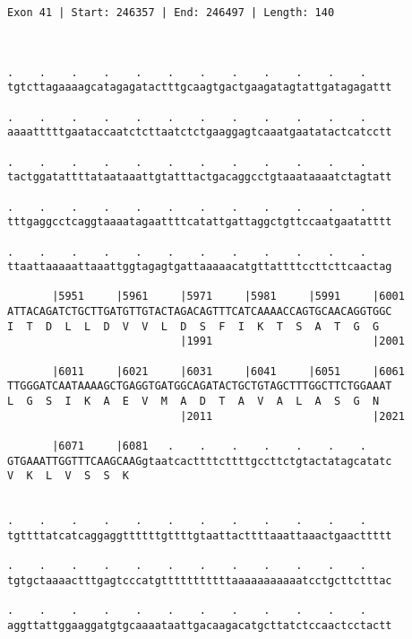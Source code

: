\documentclass{article}
\begin{document}
\begin{Verbatim}
Exon 41 | Start: 246357 | End: 246497 | Length: 140



.    .    .    .    .    .    .    .    .    .    .    .    
tgtcttagaaaagcatagagatactttgcaagtgactgaagatagtattgatagagattt
                                                            
.    .    .    .    .    .    .    .    .    .    .    .    
aaaatttttgaataccaatctcttaatctctgaaggagtcaaatgaatatactcatcctt
                                                            
.    .    .    .    .    .    .    .    .    .    .    .    
tactggatattttataataaattgtatttactgacaggcctgtaaataaaatctagtatt
                                                            
.    .    .    .    .    .    .    .    .    .    .    .    
tttgaggcctcaggtaaaatagaattttcatattgattaggctgttccaatgaatatttt
                                                            
.    .    .    .    .    .    .    .    .    .    .    .    
ttaattaaaaattaaattggtagagtgattaaaaacatgttattttccttcttcaactag
                                                            
       |5951     |5961     |5971     |5981     |5991     |6001
ATTACAGATCTGCTTGATGTTGTACTAGACAGTTTCATCAAAACCAGTGCAACAGGTGGC
I  T  D  L  L  D  V  V  L  D  S  F  I  K  T  S  A  T  G  G  
                           |1991                         |2001
  
       |6011     |6021     |6031     |6041     |6051     |6061
TTGGGATCAATAAAAGCTGAGGTGATGGCAGATACTGCTGTAGCTTTGGCTTCTGGAAAT
L  G  S  I  K  A  E  V  M  A  D  T  A  V  A  L  A  S  G  N  
                           |2011                         |2021
  
       |6071     |6081   .    .    .    .    .    .    .    
GTGAAATTGGTTTCAAGCAAGgtaatcacttttcttttgccttctgtactatagcatatc
V  K  L  V  S  S  K                                         
                                                            
  
.    .    .    .    .    .    .    .    .    .    .    .    
tgttttatcatcaggaggttttttgttttgtaattacttttaaattaaactgaacttttt
                                                            
.    .    .    .    .    .    .    .    .    .    .    .    
tgtgctaaaactttgagtcccatgtttttttttttaaaaaaaaaaatcctgcttctttac
                                                            
.    .    .    .    .    .    .    .    .    .    .    .    
aggttattggaaggatgtgcaaaataattgacaagacatgcttatctccaactcctactt
                                                            

\end{Verbatim}
\end{document}
